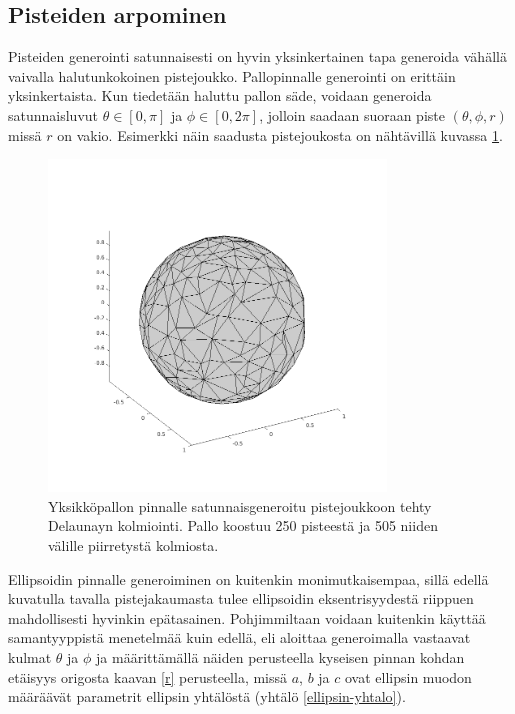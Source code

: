 \documentclass[12pt,a4paper,titlepage]{article}
\begin{document}
\subsection{Pisteiden arpominen}
Pisteiden generointi satunnaisesti on hyvin yksinkertainen tapa generoida vähällä vaivalla halutunkokoinen pistejoukko. Pallopinnalle generointi on erittäin yksinkertaista. Kun tiedetään haluttu pallon säde, voidaan generoida satunnaisluvut $\theta \in [0, \pi]$ ja $\phi \in [0, 2\pi]$, jolloin saadaan suoraan piste $(\theta, \phi, r)$ missä $r$ on vakio. Esimerkki näin saadusta pistejoukosta on nähtävillä kuvassa \ref{satunnaispallo}.

\begin{figure}[h]
  \centering
  \includegraphics[width=0.8\textwidth]{../Delaunay/data/pallo250/pallo2.png}
  \caption{Yksikköpallon pinnalle satunnaisgeneroitu pistejoukkoon tehty Delaunayn kolmiointi. Pallo koostuu 250 pisteestä ja 505 niiden välille piirretystä kolmiosta.}
  \label{satunnaispallo}
\end{figure}

Ellipsoidin pinnalle generoiminen on kuitenkin monimutkaisempaa, sillä edellä kuvatulla tavalla pistejakaumasta tulee ellipsoidin eksentrisyydestä riippuen mahdollisesti hyvinkin epätasainen. Pohjimmiltaan voidaan kuitenkin käyttää samantyyppistä menetelmää kuin edellä, eli aloittaa generoimalla vastaavat kulmat $\theta$ ja $\phi$ ja määrittämällä näiden perusteella kyseisen pinnan kohdan etäisyys origosta kaavan \ref{r} perusteella, missä $a$, $b$ ja $c$ ovat ellipsin muodon määräävät parametrit ellipsin yhtälöstä (yhtälö \ref{ellipsin-yhtalo}).
\end{document}
